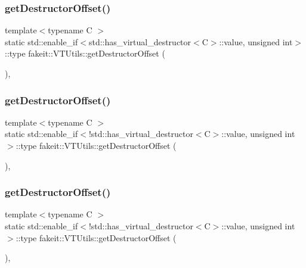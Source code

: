 \subsubsection{\texorpdfstring{getDestructorOffset()}{getDestructorOffset()}\hspace{0.1cm}{\footnotesize\ttfamily [12/18]}}
{\footnotesize\ttfamily template$<$typename C $>$ \\
static std\+::enable\+\_\+if$<$std\+::has\+\_\+virtual\+\_\+destructor$<$C$>$\+::value, unsigned int$>$\+::type fakeit\+::\+V\+T\+Utils\+::get\+Destructor\+Offset (\begin{DoxyParamCaption}{ }\end{DoxyParamCaption})\hspace{0.3cm}{\ttfamily [inline]}, {\ttfamily [static]}}

\mbox{\label{classfakeit_1_1VTUtils_ac13eea89df8b1656a1bedb9a9bb5c518}} 
\subsubsection{\texorpdfstring{getDestructorOffset()}{getDestructorOffset()}\hspace{0.1cm}{\footnotesize\ttfamily [13/18]}}
{\footnotesize\ttfamily template$<$typename C $>$ \\
static std\+::enable\+\_\+if$<$!std\+::has\+\_\+virtual\+\_\+destructor$<$C$>$\+::value, unsigned int$>$\+::type fakeit\+::\+V\+T\+Utils\+::get\+Destructor\+Offset (\begin{DoxyParamCaption}{ }\end{DoxyParamCaption})\hspace{0.3cm}{\ttfamily [inline]}, {\ttfamily [static]}}

\mbox{\label{classfakeit_1_1VTUtils_ac13eea89df8b1656a1bedb9a9bb5c518}} 
\subsubsection{\texorpdfstring{getDestructorOffset()}{getDestructorOffset()}\hspace{0.1cm}{\footnotesize\ttfamily [14/18]}}
{\footnotesize\ttfamily template$<$typename C $>$ \\
static std\+::enable\+\_\+if$<$!std\+::has\+\_\+virtual\+\_\+destructor$<$C$>$\+::value, unsigned int$>$\+::type fakeit\+::\+V\+T\+Utils\+::get\+Destructor\+Offset (\begin{DoxyParamCaption}{ }\end{DoxyParamCaption})\hspace{0.3cm}{\ttfamily [inline]}, {\ttfamily [static]}}

